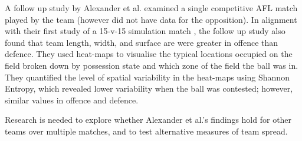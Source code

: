 A follow up study by Alexander et al. \cite{Alexander2019b} examined a single competitive AFL match played by the team (however did not have data for the opposition). In alignment with their first study of a 15-v-15 simulation match \cite{Alexander2019a}, the follow up study also found that team length, width, and surface are were greater in offence than defence. They used heat-maps to visualise the typical locations occupied on the field broken down by possession state and which zone of the field the ball was in. They quantified the level of spatial variability in the heat-maps using Shannon Entropy, which revealed lower variability when the ball was contested; however, similar values in offence and defence.

Research is needed to explore whether Alexander et al.'s findings hold for other \afl{} teams over multiple matches, and to test alternative measures of team spread.







